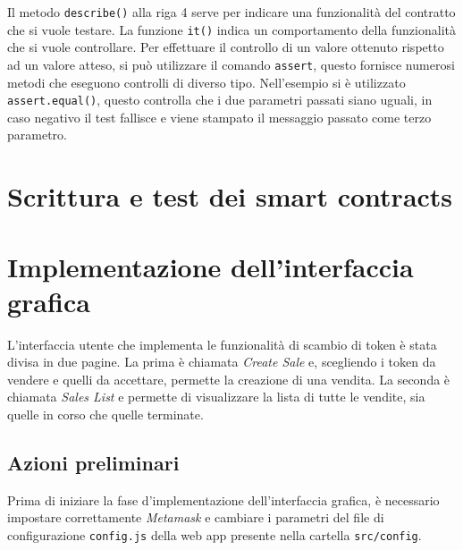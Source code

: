\documentclass[a4paper]{article}
\begin{document}
        Il metodo \verb|describe()| alla riga 4 serve per indicare una funzionalità del contratto che si vuole testare.
        La funzione \verb|it()| indica un comportamento della funzionalità che si vuole controllare.
        \newline
        Per effettuare il controllo di un valore ottenuto rispetto ad un valore atteso, si può utilizzare il comando \verb|assert|, questo fornisce numerosi metodi che eseguono controlli di diverso tipo.
        Nell'esempio si è utilizzato \verb|assert.equal()|, questo controlla che i due parametri passati siano uguali, in caso negativo il test fallisce e viene stampato il messaggio passato come terzo parametro.
        \newpage

        \section{Scrittura e test dei smart contracts}
        \newpage

        \section{Implementazione dell'interfaccia grafica}
        L'interfaccia utente che implementa le funzionalità di scambio di token è stata divisa in due pagine.
        La prima è chiamata \emph{Create Sale} e, scegliendo i token da vendere e quelli da accettare, permette
        la creazione di una vendita. La seconda è chiamata \emph{Sales List} e permette di visualizzare la lista di tutte le vendite, sia quelle in corso
        che quelle terminate.

        \subsection{Azioni preliminari}
        Prima di iniziare la fase d'implementazione dell'interfaccia grafica, è necessario impostare correttamente \emph{Metamask} e cambiare i parametri del file di configurazione \verb|config.js| della web app presente nella cartella \verb|src/config|.
\end{document}
